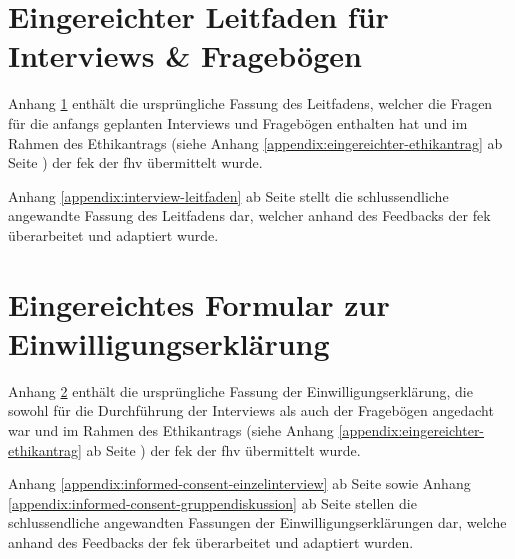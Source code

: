 \documentclass[a4paper,12pt,twoside,numbers=noendperiod]{scrreprt}
\begin{document}
\cleardoublepage
\chapter{Eingereichter Leitfaden für Interviews \& Fragebögen}
\label{appendix:ursprünglicher-leitfaden}

Anhang \ref{appendix:ursprünglicher-leitfaden} enthält die ursprüngliche Fassung des Leitfadens, welcher die Fragen für die anfangs geplanten Interviews und Fragebögen enthalten hat und im Rahmen des Ethikantrags (siehe Anhang \ref{appendix:eingereichter-ethikantrag} ab Seite \pageref{appendix:eingereichter-ethikantrag}) der \acl{fek} der \acl{fhv} übermittelt wurde.

\medskip

Anhang \ref{appendix:interview-leitfaden} ab Seite \pageref{appendix:interview-leitfaden} stellt die schlussendliche angewandte Fassung des Leitfadens dar, welcher anhand des Feedbacks der \ac{fek} überarbeitet und adaptiert wurde.



\cleardoublepage
\chapter{Eingereichtes Formular zur Einwilligungserklärung}
\label{appendix:ursprüngliches-informed-consent-formular}

Anhang \ref{appendix:ursprüngliches-informed-consent-formular} enthält die ursprüngliche Fassung der Einwilligungserklärung, die sowohl für die Durchführung der Interviews als auch der Fragebögen angedacht war und im Rahmen des Ethikantrags (siehe Anhang \ref{appendix:eingereichter-ethikantrag} ab Seite \pageref{appendix:eingereichter-ethikantrag}) der \acl{fek} der \acl{fhv} übermittelt wurde.

\medskip

Anhang \ref{appendix:informed-consent-einzelinterview} ab Seite \pageref{appendix:informed-consent-einzelinterview} sowie Anhang \ref{appendix:informed-consent-gruppendiskussion} ab Seite \pageref{appendix:informed-consent-gruppendiskussion} stellen die schlussendliche angewandten Fassungen der Einwilligungserklärungen dar, welche anhand des Feedbacks der \ac{fek} überarbeitet und adaptiert wurden.



\cleardoublepage
\end{document}
